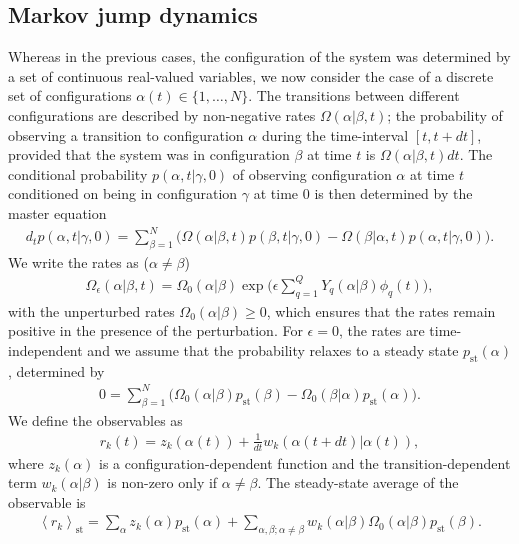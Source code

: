 \documentclass[aps,pre,twocolumn,superscriptaddress,notitlepage]{revtex4-2}
\newcommand{\Av}[1]{\left\langle #1 \right\rangle}
\begin{document}
\subsection{Markov jump dynamics}  \label{sec-fffri-jump}
Whereas in the previous cases, the configuration of the system was determined by a set of continuous real-valued variables, we now consider the case of a discrete set of configurations $\alpha(t) \in \lbrace 1,\ldots,N \rbrace$.
The transitions between different configurations are described by non-negative rates $\Omega(\alpha \vert \beta,t)$; the probability of observing a transition to configuration $\alpha$ during the time-interval $[t,t+dt]$, provided that the system was in configuration $\beta$ at time $t$ is $\Omega(\alpha \vert \beta,t) dt$.
The conditional probability $p(\alpha,t \vert \gamma,0)$ of observing configuration $\alpha$ at time $t$ conditioned on being in configuration $\gamma$ at time $0$ is then determined by the master equation
\begin{align}
d_t p(\alpha,t \vert \gamma,0) = \sum_{\beta = 1}^N \Big( \Omega(\alpha \vert \beta,t) p(\beta,t \vert \gamma,0) - \Omega(\beta \vert \alpha,t) p(\alpha,t \vert \gamma,0) \Big) . \label{master}
\end{align}
We write the rates as ($\alpha \neq \beta$)
\begin{align}
\Omega_\epsilon(\alpha \vert \beta,t) = \Omega_0(\alpha \vert \beta) \exp \bigg( \epsilon \sum_{q = 1}^Q Y_q(\alpha \vert \beta) \phi_q(t) \bigg) \label{rates} ,
\end{align}
with the unperturbed rates $\Omega_0(\alpha \vert \beta) \geq 0$, which ensures that the rates remain positive in the presence of the perturbation.
For $\epsilon = 0$, the rates are time-independent and we assume that the probability relaxes to a steady state $p_\text{st}(\alpha)$, determined by
\begin{align}
0 = \sum_{\beta = 1}^N \Big( \Omega_0(\alpha \vert \beta) p_\text{st}(\beta) - \Omega_0(\beta \vert \alpha) p_\text{st}(\alpha) \Big).
\end{align}
We define the observables as
\begin{align}
r_k(t) = z_k(\alpha(t)) + \frac{1}{dt} w_k(\alpha(t+dt) \vert \alpha(t)) \label{observable-jump} ,
\end{align}
where $z_k(\alpha)$ is a configuration-dependent function and the transition-dependent term $w_k(\alpha \vert \beta)$ is non-zero only if $\alpha \neq \beta$.
The steady-state average of the observable is
\begin{align}
\Av{r_k}_\text{st} = \sum_\alpha z_k(\alpha) p_\text{st}(\alpha) + \sum_{\alpha,\beta; \alpha \neq \beta} w_k(\alpha \vert \beta) \Omega_0(\alpha \vert \beta) p_\text{st}(\beta) .
\end{align}
\end{document}
